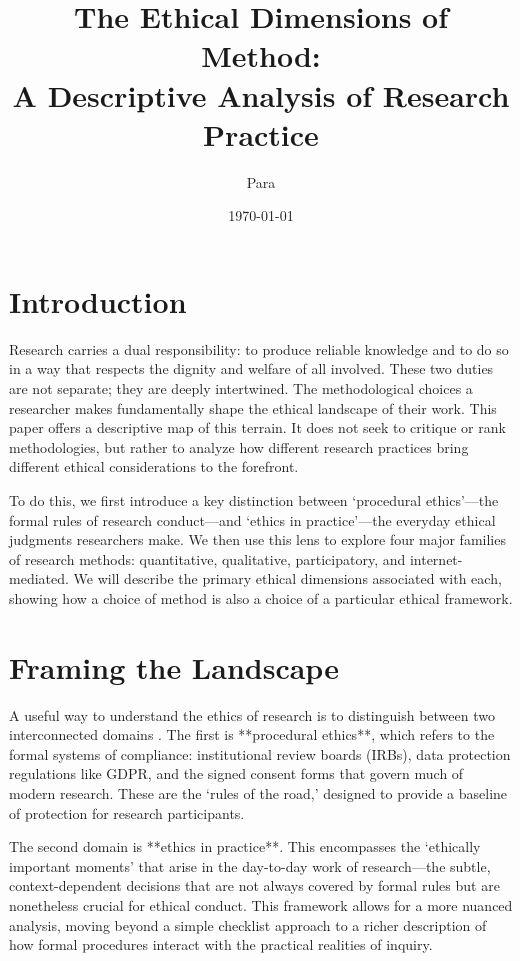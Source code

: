 \documentclass[11pt, letterpaper]{article}
\title{The Ethical Dimensions of Method: \\ A Descriptive Analysis of Research Practice}
\author{Para}
\date{\today}
\begin{document}
\maketitle

\section{Introduction}

Research carries a dual responsibility: to produce reliable knowledge and to do so in a way that respects the dignity and welfare of all involved. These two duties are not separate; they are deeply intertwined. The methodological choices a researcher makes fundamentally shape the ethical landscape of their work. This paper offers a descriptive map of this terrain. It does not seek to critique or rank methodologies, but rather to analyze how different research practices bring different ethical considerations to the forefront. 

To do this, we first introduce a key distinction between `procedural ethics'---the formal rules of research conduct---and `ethics in practice'---the everyday ethical judgments researchers make. We then use this lens to explore four major families of research methods: quantitative, qualitative, participatory, and internet-mediated. We will describe the primary ethical dimensions associated with each, showing how a choice of method is also a choice of a particular ethical framework.

\section{Framing the Landscape}

A useful way to understand the ethics of research is to distinguish between two interconnected domains \citep{ec_2018}. The first is **procedural ethics**, which refers to the formal systems of compliance: institutional review boards (IRBs), data protection regulations like GDPR, and the signed consent forms that govern much of modern research. These are the `rules of the road,' designed to provide a baseline of protection for research participants.

The second domain is **ethics in practice**. This encompasses the `ethically important moments' that arise in the day-to-day work of research---the subtle, context-dependent decisions that are not always covered by formal rules but are nonetheless crucial for ethical conduct. This framework allows for a more nuanced analysis, moving beyond a simple checklist approach to a richer description of how formal procedures interact with the practical realities of inquiry.
\end{document}
